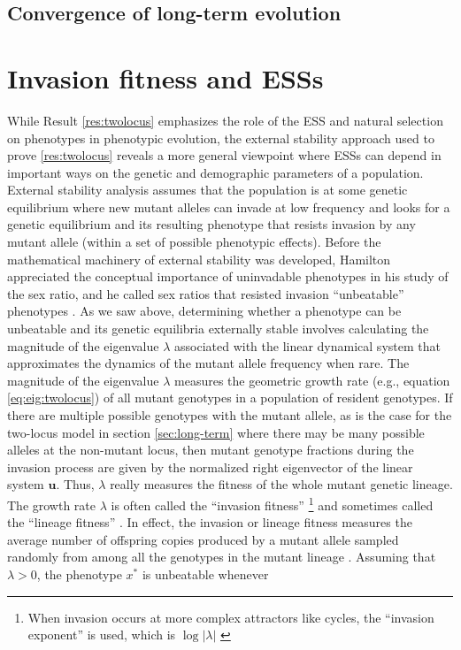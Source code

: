 \documentclass[11pt]{article}
\newcommand{\ess}[1]{#1^*}
\renewcommand{\vec}[1]{\symbf{#1}}
\newcommand{\eig}{\lambda}
\begin{document}
\subsection{Convergence of long-term evolution}


\section{Invasion fitness and ESSs}

While Result \ref{res:twolocus} emphasizes the role of the ESS and natural selection on phenotypes in phenotypic evolution, the external stability approach used to prove \ref{res:twolocus} reveals a more general viewpoint where ESSs can depend in important ways on the genetic and demographic parameters of a population. External stability analysis assumes that the population is at some genetic equilibrium where new mutant alleles can invade at low frequency and looks for a genetic equilibrium and its resulting phenotype that resists invasion by any mutant allele (within a set of possible phenotypic effects). Before the mathematical machinery of external stability was developed, Hamilton appreciated the conceptual importance of uninvadable phenotypes in his study of the sex ratio, and he called sex ratios that resisted invasion ``unbeatable'' phenotypes \cite{Hamilton:1967}. As we saw above, determining whether a phenotype can be unbeatable and its genetic equilibria externally stable involves calculating the magnitude of the eigenvalue $\eig$ associated with the linear dynamical system that approximates the dynamics of the mutant allele frequency when rare. The magnitude of the eigenvalue $\eig$ measures the geometric growth rate (e.g., equation \eqref{eq:eig:twolocus}) of all mutant genotypes in a population of resident genotypes. If there are multiple possible genotypes with the mutant allele, as is the case for the two-locus model in section \ref{sec:long-term} where there may be many possible alleles at the non-mutant locus, then mutant genotype fractions during the invasion process are given by the normalized right eigenvector of the linear system $\vec{u}$. Thus, $\eig$ really measures the fitness of the whole mutant genetic lineage. The growth rate $\eig$ is often called the ``invasion fitness'' \cite{Metz:Nisbet:1992,Heino:Metz:1998}\footnote{When invasion occurs at more complex attractors like cycles, the ``invasion exponent'' is used, which is $\log |\eig|$ \cite{Rand:Wilson:1994}} and sometimes called the ``lineage fitness'' \cite{Lehmann:Alger:2015,Akcay:VanCleve:2016,Lehmann:Mullon:2016,Lehmann:Rousset:2020}. In effect, the invasion or lineage fitness measures the average number of offspring copies produced by a mutant allele sampled randomly from among all the genotypes in the mutant lineage \cite{Lehmann:Mullon:2016}. Assuming that $\eig >0$, the phenotype $\ess{x}$ is unbeatable whenever
\end{document}
